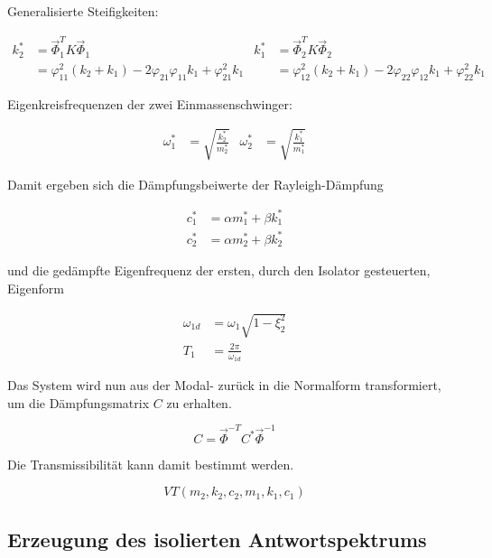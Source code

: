Generalisierte Steifigkeiten:

\begin{align*}
k_2^* &= \vec{\Phi}_1^T K \vec{\Phi}_1                                                          &   k_1^* &= \vec{\Phi}_2^T K \vec{\Phi}_2\\
      &= \varphi_{11}^2 (k_2 + k_1) - 2 \varphi_{21} \varphi_{11} k_1 + \varphi_{21}^2 k_1      &         &= \varphi_{12}^2 (k_2 + k_1) - 2 \varphi_{22} \varphi_{12} k_1 + \varphi_{22}^2 k_1
\end{align*}

Eigenkreisfrequenzen der zwei Einmassenschwinger:

\begin{align*}
\omega_1^* &= \sqrt{\frac{k_2^*}{m_2^*}}  &  \omega_2^* &= \sqrt{\frac{k_1^*}{m_1^*}}
\end{align*}

Damit ergeben sich die Dämpfungsbeiwerte der Rayleigh-Dämpfung

\begin{align*}
c_1^* &= \alpha m_1^* + \beta k_1^*\\
c_2^* &= \alpha m_2^* + \beta k_2^*
\end{align*}

und die gedämpfte Eigenfrequenz der ersten, durch den Isolator gesteuerten, Eigenform  

\begin{align*}
\omega_{1d} &= \omega_1 \sqrt{1 - \xi_2^2}\\
T_1         &= \frac{2 \pi}{\omega_{1d}} 
\end{align*}

Das System wird nun aus der Modal- zurück in die Normalform transformiert, um die Dämpfungsmatrix $C$ zu erhalten. \cite{Rayleigh}

\begin{equation*}
C = \vec{\Phi}^{-T} C^* \vec{\Phi}^{-1}
\end{equation*}

Die Transmissibilität kann damit bestimmt werden.

\begin{equation}
VT(m_2, k_2, c_2, m_1, k_1, c_1)
\end{equation}

\subsection{Erzeugung des isolierten Antwortspektrums}
\label{sec:transmAWS}

